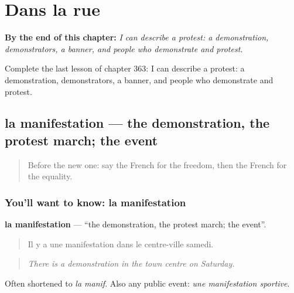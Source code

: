 
\chapter{Dans la rue}
\label{ch:fr-dans-la-rue}

\begin{chapteropening}
\textbf{By the end of this chapter:} \emph{I can describe a protest: a demonstration, demonstrators, a banner, and people who demonstrate and protest.}

Complete the last lesson of chapter 363: I can describe a protest: a demonstration, demonstrators, a banner, and people who demonstrate and protest.
\end{chapteropening}

\section[la manifestation]{la manifestation — the demonstration, the protest march; the event}

\label{lesson:FR-C363-manifestation}



\begin{quote}
Before the new one: say the French for the freedom, then the French for the equality.
\end{quote}

\subsection*{You'll want to know: la manifestation}
\textbf{la manifestation} — \textquotedblleft{}the demonstration, the protest march; the event\textquotedblright{}.

\begin{quote}
Il y a une manifestation dans le centre-ville samedi.
\end{quote}

\begin{quote}
\emph{There is a demonstration in the town centre on Saturday.}
\end{quote}

Often shortened to \emph{la manif}. Also any public event: \emph{une manifestation sportive}.

